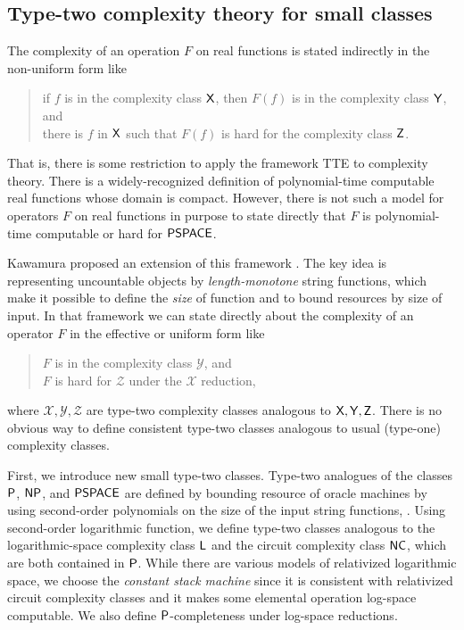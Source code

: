 \documentclass[envcountsame,orivec,oribibl]{llncs}
\begin{document}
\subsection{Type-two complexity theory for small classes}
The complexity of an operation $F$ on real functions
is stated indirectly in the non-uniform form like
\begin{quote}
 if $f$ is in the complexity class $\mathsf{X}$,
 then $F(f)$ is in the complexity class $\mathsf{Y}$, and \\
 there is $f$ in $\mathsf{X}$ such that $F(f)$ is hard for
 the complexity class $\mathsf{Z}$.
\end{quote}
That is, there is some restriction to apply the framework TTE
to complexity theory.
There is a widely-recognized definition of polynomial-time computable 
real functions whose domain is compact.
However, there is not such a model for
operators $F$ on real functions in purpose to state
directly that $F$ is polynomial-time computable or hard for $\mathsf{PSPACE}$.

Kawamura proposed an extension of this framework \cite{kawamura2012complexity}.
The key idea is representing uncountable 
objects by \emph{length-monotone} string functions, which make it possible to define the
\emph{size} of function and to bound resources by size of input.
In that framework we can state directly about the complexity of
 an operator $F$ in the effective or uniform form like
\begin{quote}
 $F$ is in the complexity class $\mathcal Y$, and \\
 $F$ is hard for $\mathcal Z$ under the $\mathcal X$ reduction,
\end{quote}
where $\mathcal{X, Y, Z}$ are type-two complexity classes analogous to $\mathsf{X, Y, Z}$.
There is no obvious way to define consistent type-two classes 
analogous to usual (type-one) complexity classes.

First, we introduce new small type-two classes.
Type-two analogues of the classes $\mathsf{P}$, $\mathsf{NP}$, and $\mathsf{PSPACE}$
are defined by bounding resource of oracle machines by using 
second-order polynomials on the size of the input string functions,
\cite{kawamura2012complexity}.
Using second-order logarithmic function,
we define type-two classes analogous to the logarithmic-space 
complexity class $\mathsf{L}$ and the circuit complexity class $\mathsf{NC}$, 
which are both contained in $\mathsf{P}$.
While there are various models of relativized logarithmic space,
we choose the \emph{constant stack machine} \cite{aehlig2007relativizing} 
since it is consistent with relativized circuit complexity classes 
and it makes some elemental operation log-space computable.
We also define $\mathsf{P}$-completeness under log-space reductions.
\end{document}
